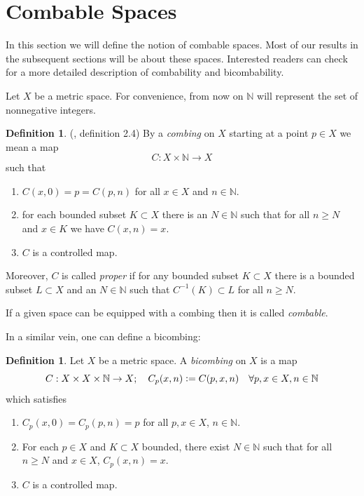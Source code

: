 \documentclass {amsart}
\newcommand {\N}        {\mathbb{N}}
\theoremstyle {definition}
\newtheorem   {definition}  [theorem] {Definition}
\begin{document}
\section {Combable Spaces}

In this section we will define the notion of combable spaces. Most of our
results in the subsequent sections will be about these spaces.
Interested readers can check \cite{katoAsymptoticLipschitzMaps2000} for a
more detailed description of combability and bicombability.

Let \( X \) be a metric space. For convenience, from now on \( \N \) will
represent the set of nonnegative integers.

\begin{definition}
    (\cite{engelCoronasProperlyCombable2021}, definition 2.4)
    By a \emph{combing} on \( X \) starting at  a point \( p \in X \) we mean a
    map
    \[
        C : X \times \N \to X
    \]
    such that
    \begin{enumerate}
        \item \( C(x,0) = p = C (p,n) \) for all \( x \in X \) and \( n \in \N \).
        \item for each bounded subset \( K \subset X \) there is an \( N \in \N \) such that
              for all \( n \geq N \) and \( x \in K \) we have \( C(x,n) = x \).
        \item \( C \) is a controlled map.
    \end{enumerate}
    Moreover, \( C \) is called \emph{proper} if for any bounded subset \( K
    \subset X \) there is a bounded subset \( L \subset X \) and an \( N \in \N \)
    such that \( C ^{-1} (K) \subset L \) for all \( n \geq N \).
\end{definition}

If a given space can be equipped with a combing then it is called
\emph{combable}.

In a similar vein, one can define a bicombing:

\begin{definition}
    Let \( X \) be a metric space. A \emph{bicombing} on \( X \) is a map
    \[
        C : X \times X \times \N \to X ;
        \ \ \ C_p(x, n) \vcentcolon=  C(p, x, n)
        \ \ \ \forall p,x \in X, n \in \N
    \]
    which satisfies
    \begin{enumerate}
        \item \( C_p(x, 0) = C_p(p, n) = p \) for all \( p,x \in X \), \( n \in \N
              \).
        \item For each \( p \in X \) and \( K \subset X \) bounded, there exist \( N \in \N
              \) such that for all \( n \geq N \) and \( x \in X \), \( C_p(x,n) = x \).
        \item \( C \) is a controlled map.
    \end{enumerate}
\end{definition}
\end{document}
